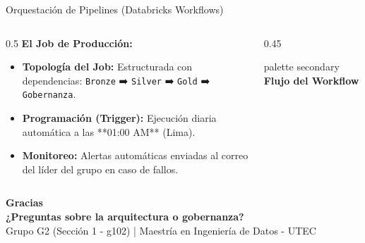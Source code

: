 \documentclass[aspectratio=169,10pt]{beamer}
\begin{document}
\begin{frame}{Orquestación de Pipelines (Databricks Workflows)}
    \begin{columns}
        \begin{column}{0.5\textwidth}
            \textbf{El Job de Producción:}
            \begin{itemize}
                \setlength{\itemsep}{0.4em}
                \item \textbf{Topología del Job:} Estructurada con dependencias: \texttt{Bronze} ➡️ \texttt{Silver} ➡️ \texttt{Gold} ➡️ \texttt{Gobernanza}.
                \item \textbf{Programación (Trigger):} Ejecución diaria automática a las **01:00 AM** (Lima).
                \item \textbf{Monitoreo:} Alertas automáticas enviadas al correo del líder del grupo en caso de fallos.
            \end{itemize}
        \end{column}
        \begin{column}{0.45\textwidth}
            \centering
            \begin{beamercolorbox}[shadow=true,rounded=true,wd=\textwidth]{palette secondary}
                \centering \textbf{Flujo del Workflow}
            \end{beamercolorbox}
            \vspace{0.4cm}
            \small
        \end{column}
    \end{columns}
\end{frame}

{
\begin{frame}[plain]
    \centering
    \vspace{1.5cm}
    {\LARGE \color{UtecCyan} \textbf{Gracias}} \\[0.6cm]
    {\large \color{white} \textbf{¿Preguntas sobre la arquitectura o gobernanza?}} \\[0.8cm]
    \footnotesize
    \color{white!70}
    Grupo G2 (Sección 1 - g102) | Maestría en Ingeniería de Datos - UTEC
\end{frame}
}
\end{document}
